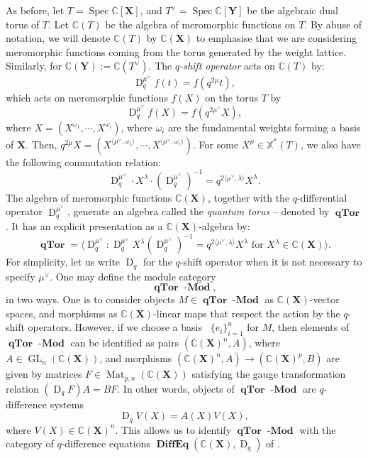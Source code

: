 \documentclass[a4paper]{report}
\theoremstyle{theorem}
\theoremstyle{definition}
\theoremstyle{remark}
\theoremstyle{proposition}
\theoremstyle{conjecture}
\theoremstyle{lemma}
\theoremstyle{corollary}
\theoremstyle{exercise}
\theoremstyle{example}
\newcommand{\C}{\mathbb{C}}
\newcommand{\on}{\operatorname}
\newcommand{\spec}{\on{Spec}}
\newcommand{\lmod}{\on{\mathbf{-Mod}}}
\newcommand{\qTor}{\on{\mathbf{qTor}}}
\newcommand{\DiffEq}{\on{\mathbf{DiffEq}}}
\begin{document}
  As before, let $T = \spec \C[\mathbf{X}]$, and $T^\vee = \spec \C[\mathbf{Y}]$
  be the algebraic dual torus of $T$. Let $\C(T)$ be the algebra of meromorphic
  functions on $T$. By abuse of notation, we will denote $\C(T)$ by $\C(\mathbf{X})$ to emphasise 
  that we are considering meromorphic functions coming from the torus generated by the weight lattice.
  Similarly, for $\C(\mathbf{Y}) := \C(T^\vee)$.
  The \emph{$q$-shift operator} acts on $\C(T)$ by:
  $$\on{D}^{\mu^\vee}_q f(t) = f(q^{2\mu}t),$$
  which acts on meromorphic functions $f(X)$ on the torus $T$ by 
  $$\on{D}_q^{\mu^\vee} f(X) = f(q^{2\mu^\vee}X),$$ 
  where $X = (X^{\omega_1},\cdots, X^{\omega_i})$, where $\omega_i$ are the fundamental weights 
  forming a basis of $\mathbf{X}$. Then, $q^{2\mu} X = (X^{\langle \mu^\vee,\omega_1\rangle}, \cdots, X^{\langle \mu^\vee,\omega_r\rangle})$.
  For some $X^\mu \in \mathbb{X}^\ast(T)$, we also have the following commutation relation:
  $$\on{D}^{\mu^\vee}_q \cdot X^\lambda \cdot (\on{D}^{\mu^\vee}_q)^{-1}= q^{2\langle \mu^\vee,\lambda\rangle} X^\lambda.$$
  The algebra of meromorphic functions $\C(\mathbf{X})$, together with the 
  $q$-differential operator $\on{D}_q^{\mu^\vee}$, generate an algebra called 
  the \emph{quantum torus} -- denoted by $\qTor$. It has an explicit presentation
  as a $\C(\mathbf{X})$-algebra by:
  $$\qTor = \langle \on{D}_q^{\mu^\vee} : \text{$\on{D}_q^{\mu^\vee} X^\lambda (\on{D}_q^{\mu^\vee})^{-1} = q^{2\langle \mu^\vee,\lambda \rangle} X^\lambda$ for $X^\lambda \in \C(\mathbf{X})$}\rangle.$$
  For simplicity, let us write $\on{D}_q$ for the $q$-shift operator when
  it is not necessary to specify $\mu^\vee$.
  One may define the module category $$\qTor\lmod,$$ in two ways. One is to
  consider objects $M \in \qTor\lmod$ as $\C(\mathbf{X})$-vector spaces,
  and morphisms as $\C(\mathbf{X})$-linear maps that respect the action by
  the $q$-shift operators. However, if we choose a basis \
  $\lbrace e_i \rbrace_{i=1}^n$ for $M$, then elements
  of $\qTor\lmod$ can be identified as pairs 
  $(\C(\mathbf{X})^n, A)$, where $A \in \on{GL}_n(\C(\mathbf{X}))$, and morphisms
  $(\C(\mathbf{X})^n,A) \to (\C(\mathbf{X})^p,B)$ are given by matrices
  $F \in \on{Mat}_{p,n}(\C(\mathbf{X}))$ satisfying the gauge transformation
  relation $(\on{D}_q F)A = BF$. In other words, objects 
  of $\qTor\lmod$ are $q$-difference systems $$\on{D}_qV(X) = A(X) V(X),$$
  where $V(X) \in \C(\mathbf{X})^n$.
  This allows us to identify $\qTor\lmod$ with the category of $q$-difference
  equations $\DiffEq(\C(\mathbf{X}),\on{D}_q)$ of \cite{sauloy03}.\\\\
\end{document}
